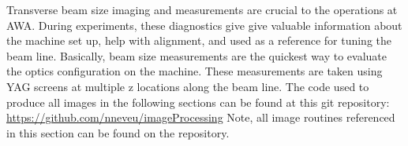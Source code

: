  \label{sec:beamsize}

Transverse beam size imaging and measurements are crucial to the 
operations at AWA. During experiments, these diagnostics give 
give valuable information about the machine set up, help with alignment, 
and used as a reference for tuning the beam line.
Basically, beam size measurements are the quickest way to evaluate the
optics configuration on the machine. 
These measurements are taken using YAG screens at multiple z locations along the beam line.
The code used to produce all images in the following sections can be found at this git repository: 
\url{https://github.com/nneveu/imageProcessing}
Note, all image routines referenced in this section can be found on the repository.

